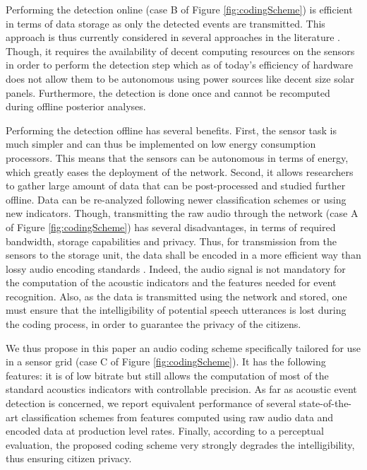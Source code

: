 \documentclass[sensors,article,submit,moreauthors,pdftex,10pt,a4paper]{mdpi}
\begin{document}
Performing the detection online (case B of Figure \ref{fig:codingScheme}) is efficient in terms of data storage as only the detected events are transmitted. This approach is thus currently considered in several approaches in the literature \cite{defreville2006automatic, mydlarz2017implementation, mydlarz2015design}. Though, it requires the availability of decent computing resources on the sensors in order to perform the detection step which as of today's efficiency of hardware does not allow them to be autonomous using power sources like decent size solar panels. Furthermore, the detection is done once and cannot be recomputed during offline posterior analyses.

Performing the detection offline has several benefits. First, the sensor task is much simpler and can thus be implemented on low energy consumption processors. This means that the sensors can be autonomous in terms of energy, which greatly eases the deployment of the network. Second, it allows researchers to gather large amount of data that can be post-processed and studied further offline. Data can be re-analyzed following newer classification schemes or using new indicators. Though, transmitting the raw audio  through the network (case A of Figure \ref{fig:codingScheme}) has several disadvantages, in terms of required bandwidth, storage capabilities and privacy. Thus, for transmission from the sensors to the storage unit, the data shall be encoded in a more efficient way than lossy audio encoding standards \cite{pan1995tutorial}. Indeed, the audio signal is not mandatory for the computation of the acoustic indicators and the features needed for event recognition. Also, as the data is transmitted using the network and stored, one must ensure that the intelligibility of potential speech utterances is lost during the coding process, in order to guarantee the privacy of the citizens.

We thus propose in this paper an audio coding scheme specifically tailored for use in a sensor grid (case C of Figure \ref{fig:codingScheme}). It has the following features: it is of low bitrate but still allows the computation of most of the standard acoustics indicators with controllable precision. As far as acoustic event detection is concerned, we report equivalent performance of several state-of-the-art classification schemes from features computed using raw audio data and encoded data at production level rates. Finally, according to a perceptual evaluation, the proposed coding scheme very strongly degrades the intelligibility, thus ensuring citizen privacy.
\end{document}
